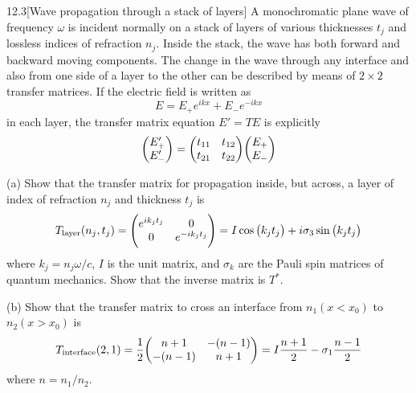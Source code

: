 \documentclass[12pt]{article}
\begin{document}
\begin{problem}{12.3}[Wave propagation through a stack of layers]
A monochromatic plane wave of frequency $\omega$ is incident normally on a stack
of layers of various thicknesses $t_j$ and lossless indices of refraction $n_j$.
Inside the stack, the wave has both forward and backward moving components. The
change in the wave through any interface and also from one side of a layer to
the other can be described by means of $2\times 2$ transfer matrices. If the
electric field is written as
\begin{equation}
    E=E_+e^{ikx}+E_-e^{-ikx} 
\end{equation}
in each layer, the transfer matrix equation $E'=TE$ is explicitly
\begin{equation}
    \mqty(E_+'\\E_-')=\mqty(t_{11}&t_{12}\\t_{21}&t_{22})\mqty(E_+\\E_-)
\end{equation}

(a) Show that the transfer matrix for propagation inside, but across, a layer of
index of refraction $n_j$ and thickness $t_j$ is
\begin{equation}
    T_\text{layer}(n_j,t_j)=\mqty(e^{ik_jt_j}&0\\0&e^{-ik_jt_j})=I\cos\qty(k_jt_j)+i\sigma_3\sin\qty(k_jt_j) 
\end{equation}
where $k_j=n_j\omega/c$, $I$ is the unit matrix, and $\sigma_k$ are the Pauli
spin matrices of quantum mechanics. Show that the inverse matrix is $T^\ast$.

(b) Show that the transfer matrix to cross an interface from $n_1(x<x_0)$ to
$n_2(x>x_0)$ is
\begin{equation}
    T_\text{interface}(2,1)=\frac12\mqty(n+1&-(n-1)\\-(n-1)&n+1)=I\frac{n+1}{2}-\sigma_1\frac{n-1}{2} 
\end{equation}
where $n=n_1/n_2$.


\end{problem}
\end{document}

